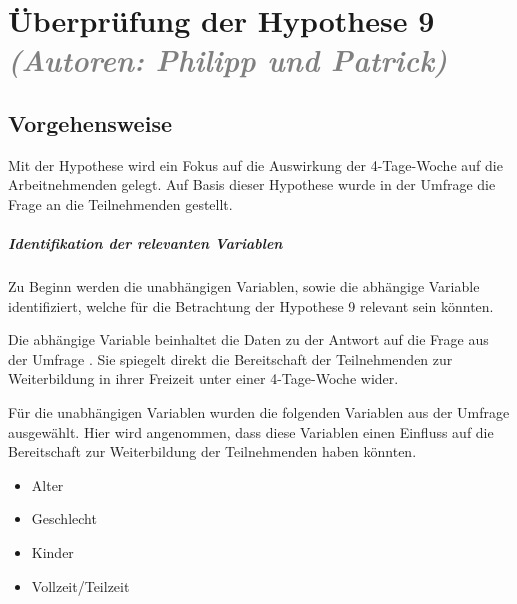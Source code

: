 
\chapter{Überprüfung der Hypothese 9 \textit{\textcolor{gray}{(Autoren: Philipp und Patrick)}}}
\label{chap:hypothese9}

\section{Vorgehensweise}
Mit der Hypothese  wird ein Fokus auf die 
Auswirkung der 4-Tage-Woche auf die Arbeitnehmenden gelegt. Auf Basis dieser Hypothese 
wurde in der Umfrage
die Frage  an die Teilnehmenden gestellt.

\paragraph*{Identifikation der relevanten Variablen}

Zu Beginn werden die unabhängigen Variablen, sowie die abhängige Variable identifiziert, 
welche für die Betrachtung der Hypothese 9 relevant sein könnten.

Die abhängige Variable beinhaltet die Daten zu der Antwort auf die Frage aus der Umfrage
.
Sie spiegelt direkt die Bereitschaft der Teilnehmenden zur Weiterbildung in ihrer Freizeit 
unter einer 4-Tage-Woche wider.

Für die unabhängigen Variablen wurden die folgenden Variablen aus der Umfrage ausgewählt. 
Hier wird angenommen, dass diese Variablen einen Einfluss auf die Bereitschaft zur 
Weiterbildung der Teilnehmenden haben könnten.
\begin{itemize}
    \item Alter
    \item Geschlecht 
    \item Kinder 
    \item Vollzeit/Teilzeit
\end{itemize}


